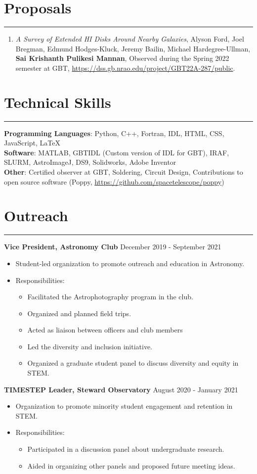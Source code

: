 \documentclass[11pt]{article}
\newcommand{\resumesection}[1]{\vspace{-0.2cm}\section*{#1}\vspace{-0.2cm}\hrule\vspace{0.2cm}}
\begin{document}
\resumesection{Proposals}
\begin{enumerate} 
    \item \textit{A Survey of Extended HI Disks Around Nearby Galaxies}, Alyson Ford, Joel Bregman, Edmund Hodges-Kluck, Jeremy Bailin, Michael Hardegree-Ullman, \textbf{Sai Krishanth Pulikesi Mannan}, Observed during the Spring 2022 semester at GBT, \url{https://dss.gb.nrao.edu/project/GBT22A-287/public}.
\end{enumerate}
\resumesection{Technical Skills}

\textbf{Programming Languages}: Python, C++, Fortran, IDL, HTML, CSS, JavaScript, \LaTeX 
\\
\textbf{Software}: MATLAB, GBTIDL (Custom version of IDL for GBT), IRAF, SLURM, AstroImageJ, DS9, Solidworks, Adobe Inventor
\\
\textbf{Other}: Certified observer at GBT, Soldering, Circuit Design, Contributions to open source software (Poppy, \url{https://github.com/spacetelescope/poppy})

\resumesection{Outreach}
\textbf{Vice President, Astronomy Club} \hfill December 2019 - September 2021
\begin{itemize}
	\item Student-led organization to promote outreach and education in Astronomy. 
	\item Responsibilities: 
	\begin{itemize}
		\item Facilitated the Astrophotography program in the club.
		\item Organized and planned field trips.
		\item Acted as liaison between officers and club members
		\item Led the diversity and inclusion initiative.
		\item Organized a graduate student panel to discuss diversity and equity in STEM.
	\end{itemize}	       
\end{itemize} 
\textbf{TIMESTEP Leader, Steward Observatory} \hfill August 2020 - January 2021
\begin{itemize}
	\item Organization to promote minority student engagement and retention in STEM. 
	\item Responsibilities: 
	\begin{itemize}
		\item Participated in a discussion panel about undergraduate research. 
		\item Aided in organizing other panels and proposed future meeting ideas. 
	\end{itemize}    
\end{itemize} 
\end{document}
